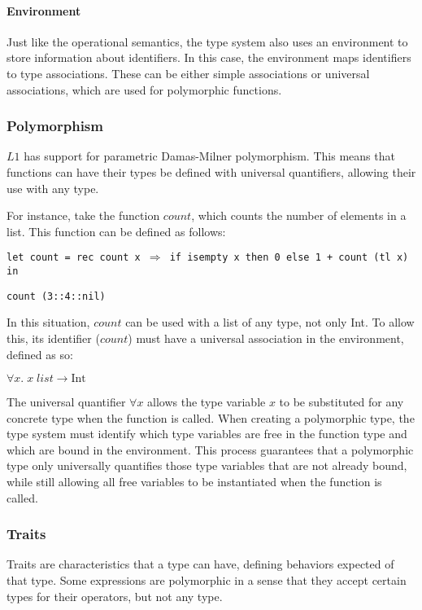 \documentclass{article}
\def\code#1{\begin{footnotesize}\texttt{#1}\end{footnotesize}}
\begin{document}
\paragraph{Environment}
Just like the operational semantics, the type system also uses an environment to store information about identifiers.
In this case, the environment maps identifiers to type associations. 
These can be either simple associations or universal associations, which are used for polymorphic functions.

\subsubsection{Polymorphism}\label{Polymorphism}

$L1$ has support for parametric Damas\hyp Milner polymorphism.
This means that functions can have their types be defined with universal quantifiers, allowing their use with any type.

For instance, take the function $count$, which counts the number of elements in a list.
This function can be defined as follows:

\smallskip

\code{let count = rec count x $\Rightarrow$ if isempty x then 0 else 1 + count (tl x) in}

\code{count (3::4::nil)}

\smallskip

In this situation, $count$ can be used with a list of any type, not only Int.
To allow this, its identifier ($count$) must have a universal association in the environment, defined as so:

\smallskip
$\forall x. \; x \; list \rightarrow \mbox{Int}$
\smallskip

The universal quantifier $\forall x$ allows the type variable $x$ to be substituted for any concrete type when the function is called.
When creating a polymorphic type, the type system must identify which type variables are free in the function type and which are bound in the environment.
This process guarantees that a polymorphic type only universally quantifies those type variables that are not already bound, while still allowing all free variables to be instantiated when the function is called.

\subsubsection{Traits}

Traits are characteristics that a type can have, defining behaviors expected of that type.
Some expressions are polymorphic in a sense that they accept certain types for their operators, but not any type.
\end{document}
